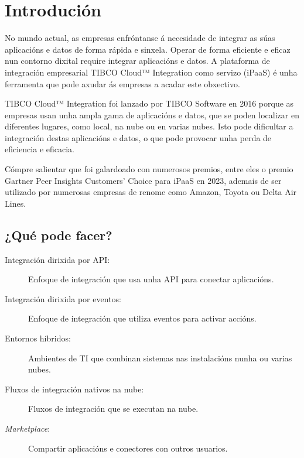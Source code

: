 \chapter{Introdución}
\label{chap:introduccion}
	
No mundo actual, as empresas enfróntanse á necesidade de integrar as súas aplicacións e datos de forma rápida e sinxela. Operar de forma eficiente e eficaz nun contorno dixital require integrar aplicacións e datos.
A plataforma de integración empresarial TIBCO Cloud™ Integration como servizo (iPaaS) é unha ferramenta que pode axudar ás empresas a acadar este obxectivo.

TIBCO Cloud™ Integration foi lanzado por TIBCO Software en 2016 porque as empresas usan unha ampla gama de aplicacións e datos, que se poden localizar en diferentes lugares, como local, na nube ou en varias nubes. Isto pode dificultar a integración destas aplicacións e datos, o que pode provocar unha perda de eficiencia e eficacia.

Cómpre salientar que foi galardoado con numerosos premios, entre eles o premio Gartner Peer Insights Customers' Choice para iPaaS en 2023, ademais de ser utilizado por numerosas empresas de renome como Amazon, Toyota ou Delta Air Lines.

\section{¿Qué pode facer?}

\begin{description}
    \item[Integración dirixida por API:] Enfoque de integración que usa unha API para conectar aplicacións.
    \item[Integración dirixida por eventos:] Enfoque de integración que utiliza eventos para activar accións.
    \item[Entornos híbridos:] Ambientes de TI que combinan sistemas nas instalacións nunha ou varias nubes.
    \item[Fluxos de integración nativos na nube:] Fluxos de integración que se executan na nube.
    \item[\textit{Marketplace}:] Compartir aplicacións e conectores con outros usuarios.
\end{description}

